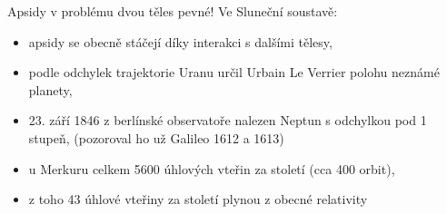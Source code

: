 \documentclass{article}
\begin{document}
Apsidy v problému dvou těles pevné! Ve Sluneční soustavě:
\begin{itemize}
    \item apsidy se obecně stáčejí díky interakci s dalšími tělesy,
    \item podle odchylek trajektorie Uranu určil Urbain Le Verrier polohu neznámé planety,
    \item 23. září 1846 z berlínské observatoře nalezen Neptun s odchylkou pod 1 stupeň, (pozoroval ho už Galileo 1612 a 1613)
    \item u Merkuru celkem 5600 úhlových vteřin za století (cca 400 orbit),
    \item z toho 43 úhlové vteřiny za století plynou z obecné relativity
\end{itemize}
\end{document}
